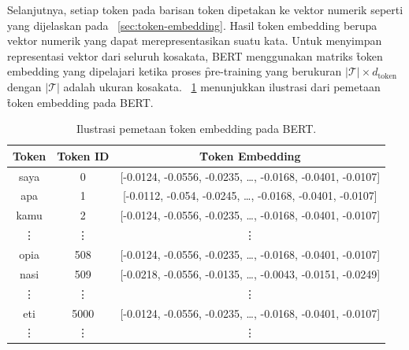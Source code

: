 Selanjutnya, setiap token pada barisan token dipetakan ke vektor numerik seperti yang dijelaskan pada \sect~\ref{sec:token-embedding}. Hasil \f{token embedding} berupa vektor numerik yang dapat merepresentasikan suatu kata. Untuk menyimpan representasi vektor dari seluruh kosakata, BERT menggunakan matriks \f{token embedding} yang dipelajari ketika proses \f{pre-training} yang berukuran $|\mathcal{T}| \times d_{\text{token}}$ dengan $|\mathcal{T}|$ adalah ukuran kosakata. \tab~\ref{tab:token-embeddings} menunjukkan ilustrasi dari pemetaan \f{token embedding} pada BERT.
\begin{table}[!ht]
	\centering
	\caption{Ilustrasi pemetaan \f{token embedding} pada BERT.}
	\label{tab:token-embeddings}
	\begin{tabular}{|c|c|c|}
		\hline
		\textbf{Token} & \textbf{Token ID} & \textbf{\f{Token Embedding}} \\
		\hline
		saya & 0 & [-0.0124, -0.0556, -0.0235, \dots, -0.0168, -0.0401, -0.0107] \\
		apa & 1 & [-0.0112, -0.054, -0.0245, \dots, -0.0168, -0.0401, -0.0107] \\
		kamu & 2 & [-0.0124, -0.0556, -0.0235, \dots, -0.0168, -0.0401, -0.0107] \\
		\vdots & \vdots & \vdots \\
		opia & 508 & [-0.0124, -0.0556, -0.0235, \dots, -0.0168, -0.0401, -0.0107] \\
		nasi & 509 & [-0.0218, -0.0556, -0.0135, \dots, -0.0043, -0.0151, -0.0249] \\
		\vdots & \vdots & \vdots \\
		eti & 5000 & [-0.0124, -0.0556, -0.0235, \dots, -0.0168, -0.0401, -0.0107] \\
		\vdots & \vdots & \vdots \\
		\hline
	\end{tabular}
\end{table}

